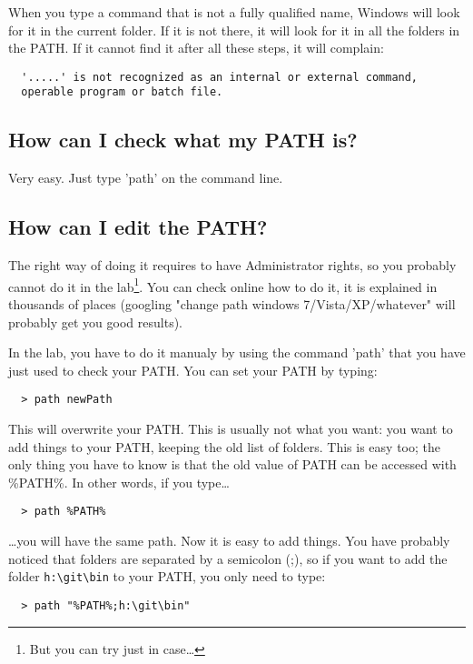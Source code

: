 \documentclass{article}
\begin{document}
When you type a command that is not a fully qualified name, Windows
will look for it in the current folder. If it is not there, it will
look for it in all the folders in the PATH. If it cannot find it after
all these steps, it will complain:

\begin{verbatim}
  '.....' is not recognized as an internal or external command,
  operable program or batch file.
\end{verbatim}

\subsection{How can I check what my PATH is?}

Very easy. Just type 'path' on the command line.

\subsection{How can I edit the PATH?}

The right way of doing it requires to have Administrator rights, so
you probably cannot do it in the lab\footnote{But you can try just in
  case\ldots}.  
You can check online how to do it, it is
explained in thousands of places (googling "change path windows
7/Vista/XP/whatever" will probably get you good results).

In the lab, you have to do it manualy by using the command 'path' that
you have 
just used to check your PATH. You can set your PATH by typing:

\begin{verbatim}
  > path newPath
\end{verbatim}


This will overwrite your PATH. This is usually not what you want: you
want to add things to your PATH, keeping the old list of folders. This
is easy too; the only thing you have to know is that the old value of
PATH can be accessed with \%PATH\%. In other words, if you type\ldots

\begin{verbatim}
  > path %PATH%
\end{verbatim}

\ldots you will have the same path. Now it is easy to add things. You
have probably noticed that folders are separated by a semicolon (;),
so if you want to add the folder \verb+h:\git\bin+ to your PATH, you
only 
need to type:

\begin{verbatim}
  > path "%PATH%;h:\git\bin"
\end{verbatim}
\end{document}
